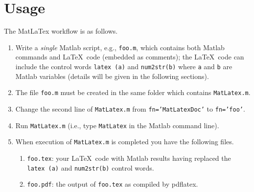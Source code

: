 \documentclass{article}
\begin{document}
  \section{Usage} 
  The \textsf{MatLaTex} workflow is as follows.  
  \begin{enumerate} 
  \item Write a \emph{single} \textsf{Matlab} script, e.g., \texttt{foo.m},  
  which contains both \textsf{Matlab} commands and \LaTeX\  code (embedded as comments); 
  the \LaTeX\  code can include the control words \texttt{latex (a)} and \texttt{num2str(b)} 
  where \texttt{a} and \texttt{b} are \textsf{Matlab} variables (details will be given in the following sections).      
  \item The file \texttt{foo.m} must be created in the same folder which contains \texttt{MatLatex.m}. 
  \item Change the second line of \texttt{MatLatex.m} from \texttt{fn='MatLatexDoc'} to \texttt{fn='foo'}. 
  \item Run \texttt{MatLatex.m} (i.e., type \texttt{MatLatex} in the \textsf{Matlab} command line). 
  \item When execution of \texttt{MatLatex.m} is completed you have the following files. 
  \begin{enumerate}   
  \item \texttt{foo.tex}: your \LaTeX\  code with \textsf{Matlab} results having replaced 
  the \texttt{latex (a)} and \texttt{num2str(b)} control words. 
  \item \texttt{foo.pdf}: the output of \texttt{foo.tex} as compiled by \textsf{pdflatex}. 
  \end{enumerate} 
  \end{enumerate} 
   
\end{document}
